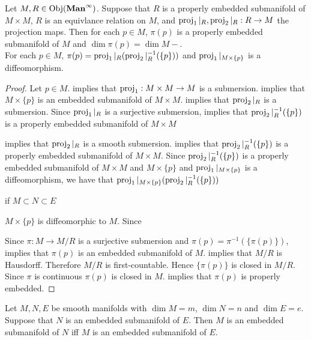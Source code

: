 \documentclass{book}
\begin{document}
	\begin{ex}
		Let $M, R \in \operatorname{Obj}(\operatorname*{\text{\textbf{Man}}^{\infty}})$. Suppose that $R$ is a properly embedded submanifold of $M \times M$, $R$ is an equivlance relation on $M$, and $\operatorname{\text{proj}}_1|_R, \operatorname{\text{proj}}_2|_R:R \rightarrow M$ the projection maps. Then for each $p \in M$, $\pi(p)$ is a properly embedded submanifold of $M$ and $\dim \pi(p) = \dim M - $. \\
		 For each $p \in M$, $\pi(p) = \operatorname{\text{proj}}_1|_R(\operatorname{\text{proj}}_2|_R^{-1}(\{p\}))$ and $\operatorname{\text{proj}}_1|_{M \times \{p\}}$ is a diffeomorphism.
	\end{ex}

	\begin{proof}
		Let $p \in M$.  implies that $\operatorname{\text{proj}}_1: M \times M \rightarrow M$ is a submersion. \rex{} implies that $M \times \{p\}$ is an embedded submanifold of $M \times M$.  implies that $\operatorname{\text{proj}}_2|_R$ is a submersion. Since $\operatorname{\text{proj}}_1|_R$ is a surjective submersion,  implies that $\operatorname{\text{proj}}_2|_R^{-1}(\{p\})$ is a properly embedded submanifold of $M \times M$
		
		  implies that $\operatorname{\text{proj}}_2|_{R}$ is a smooth submersion.  implies that $\operatorname{\text{proj}}_2|_R^{-1}(\{p\})$ is a properly embedded submanifold of $M \times M$. Since $\operatorname{\text{proj}}_2|_R^{-1}(\{p\})$ is a properly embedded submanifold of $M \times M$ and $M \times \{p\}$ and  $\operatorname{\text{proj}}_1|_{M \times \{p\}}$ is a diffeomorphism, we have that $\operatorname{\text{proj}}_1|_{M \times \{p\}}(\operatorname{\text{proj}}_2|_R^{-1}(\{p\}))$
		
		
		if $M \subset N \subset E$
		
		
		$M \times \{p\}$ is diffeomorphic to $M$. Since 
		
		
		\tcr{FIX}
		Since $\pi: M \rightarrow M / R$ is a surjective submersion and $\pi(p) = \pi^{-1}(\{\pi(p)\})$,  implies that $\pi(p)$ is an embedded submanifold of $M$.  implies that $M/R$ is Hausdorff. Therefore $M/R$ is first-countable. Hence $\{\pi(p)\}$ is closed in $M/R$. Since $\pi$ is continuous $\pi(p)$ is closed in $M$.  implies that $\pi(p)$ is properly embedded.  
	\end{proof}

	
	
	
	\begin{ex}
		Let $M, N, E$ be smooth manifolds with $\dim M = m$, $\dim N = n$ and $\dim E = e$. Suppose that $N$ is an embedded submanifold of $E$. Then $M$ is an embedded submanifold of $N$ iff $M$ is an embedded submanifold of $E$.
	\end{ex}
\end{document}
